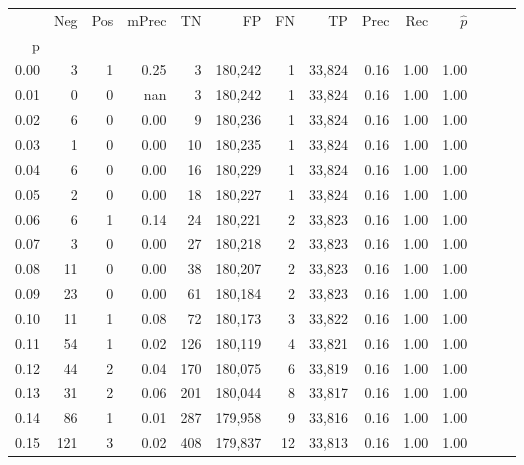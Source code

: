 \begin{tabular}{rrrrrrrrrrrrrr}
\toprule
{} &    Neg &    Pos & mPrec &       TN &       FP &      FN &      TP &  Prec &   Rec & $\hat{p}$ \\
p    &        &        &       &          &          &         &         &       &       &           \\
\midrule
0.00 &      3 &      1 &  0.25 &        3 &  180,242 &       1 &  33,824 &  0.16 &  1.00 &      1.00 \\
0.01 &      0 &      0 &   nan &        3 &  180,242 &       1 &  33,824 &  0.16 &  1.00 &      1.00 \\
0.02 &      6 &      0 &  0.00 &        9 &  180,236 &       1 &  33,824 &  0.16 &  1.00 &      1.00 \\
0.03 &      1 &      0 &  0.00 &       10 &  180,235 &       1 &  33,824 &  0.16 &  1.00 &      1.00 \\
0.04 &      6 &      0 &  0.00 &       16 &  180,229 &       1 &  33,824 &  0.16 &  1.00 &      1.00 \\
0.05 &      2 &      0 &  0.00 &       18 &  180,227 &       1 &  33,824 &  0.16 &  1.00 &      1.00 \\
0.06 &      6 &      1 &  0.14 &       24 &  180,221 &       2 &  33,823 &  0.16 &  1.00 &      1.00 \\
0.07 &      3 &      0 &  0.00 &       27 &  180,218 &       2 &  33,823 &  0.16 &  1.00 &      1.00 \\
0.08 &     11 &      0 &  0.00 &       38 &  180,207 &       2 &  33,823 &  0.16 &  1.00 &      1.00 \\
0.09 &     23 &      0 &  0.00 &       61 &  180,184 &       2 &  33,823 &  0.16 &  1.00 &      1.00 \\
0.10 &     11 &      1 &  0.08 &       72 &  180,173 &       3 &  33,822 &  0.16 &  1.00 &      1.00 \\
0.11 &     54 &      1 &  0.02 &      126 &  180,119 &       4 &  33,821 &  0.16 &  1.00 &      1.00 \\
0.12 &     44 &      2 &  0.04 &      170 &  180,075 &       6 &  33,819 &  0.16 &  1.00 &      1.00 \\
0.13 &     31 &      2 &  0.06 &      201 &  180,044 &       8 &  33,817 &  0.16 &  1.00 &      1.00 \\
0.14 &     86 &      1 &  0.01 &      287 &  179,958 &       9 &  33,816 &  0.16 &  1.00 &      1.00 \\
0.15 &    121 &      3 &  0.02 &      408 &  179,837 &      12 &  33,813 &  0.16 &  1.00 &      1.00 \\

\end{tabular}
